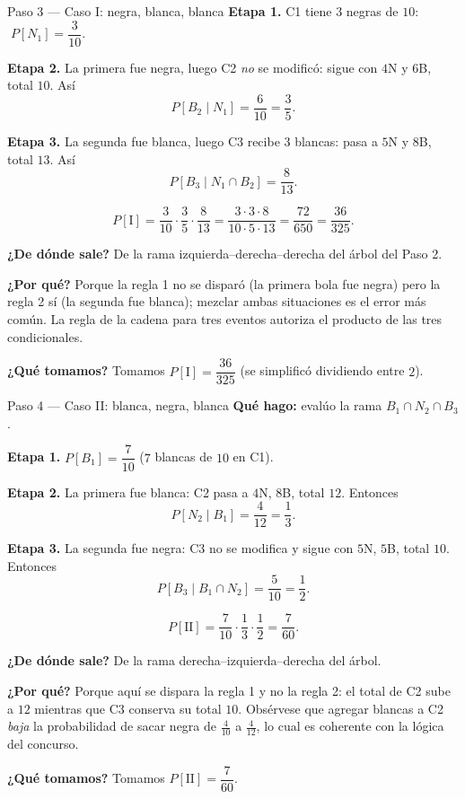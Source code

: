 \documentclass[11pt]{article}
\begin{document}
\begin{sol}
\begin{paso}{Paso 3 --- Caso I: negra, blanca, blanca}
\textbf{Etapa 1.} C1 tiene $3$ negras de $10$: $\;P[N_1]=\dfrac{3}{10}$.

\textbf{Etapa 2.} La primera fue negra, luego C2 \emph{no} se modific\'o: sigue con $4$N y $6$B, total $10$. As\'i
\[
P[B_2\mid N_1]=\frac{6}{10}=\frac{3}{5}.
\]

\textbf{Etapa 3.} La segunda fue blanca, luego C3 recibe $3$ blancas: pasa a $5$N y $8$B, total $13$. As\'i
\[
P[B_3\mid N_1\cap B_2]=\frac{8}{13}.
\]

\[
P[\text{I}]=\frac{3}{10}\cdot\frac{3}{5}\cdot\frac{8}{13}
=\frac{3\cdot 3\cdot 8}{10\cdot 5\cdot 13}=\frac{72}{650}=\frac{36}{325}.
\]

\textbf{¿De d\'onde sale?} De la rama izquierda--derecha--derecha del \'arbol del Paso 2.

\textbf{¿Por qu\'e?} Porque la regla 1 no se dispar\'o (la primera bola fue negra) pero la regla 2 s\'i (la segunda fue blanca); mezclar ambas situaciones es el error m\'as com\'un. La regla de la cadena para tres eventos autoriza el producto de las tres condicionales.

\textbf{¿Qu\'e tomamos?} Tomamos $P[\text{I}]=\dfrac{36}{325}$ (se simplific\'o dividiendo entre $2$).
\end{paso}

\begin{paso}{Paso 4 --- Caso II: blanca, negra, blanca}
\textbf{Qu\'e hago:} eval\'uo la rama $B_1\cap N_2\cap B_3$.

\textbf{Etapa 1.} $P[B_1]=\dfrac{7}{10}$ ($7$ blancas de $10$ en C1).

\textbf{Etapa 2.} La primera fue blanca: C2 pasa a $4$N, $8$B, total $12$. Entonces
\[
P[N_2\mid B_1]=\frac{4}{12}=\frac{1}{3}.
\]

\textbf{Etapa 3.} La segunda fue negra: C3 no se modifica y sigue con $5$N, $5$B, total $10$. Entonces
\[
P[B_3\mid B_1\cap N_2]=\frac{5}{10}=\frac{1}{2}.
\]

\[
P[\text{II}]=\frac{7}{10}\cdot\frac{1}{3}\cdot\frac{1}{2}=\frac{7}{60}.
\]

\textbf{¿De d\'onde sale?} De la rama derecha--izquierda--derecha del \'arbol.

\textbf{¿Por qu\'e?} Porque aqu\'i se dispara la regla 1 y no la regla 2: el total de C2 sube a $12$ mientras que C3 conserva su total $10$. Obs\'ervese que agregar blancas a C2 \emph{baja} la probabilidad de sacar negra de $\frac{4}{10}$ a $\frac{4}{12}$, lo cual es coherente con la l\'ogica del concurso.

\textbf{¿Qu\'e tomamos?} Tomamos $P[\text{II}]=\dfrac{7}{60}$.
\end{paso}


\end{sol}
\end{document}
